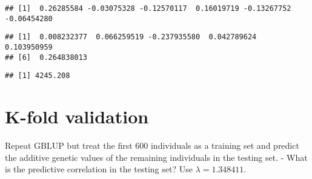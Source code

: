 \documentclass[
]{article}
\newenvironment{Shaded}{\begin{snugshade}}{\end{snugshade}}
\newcommand{\CommentTok}[1]{\textcolor[rgb]{0.56,0.35,0.01}{\textit{#1}}}
\newcommand{\FunctionTok}[1]{\textcolor[rgb]{0.13,0.29,0.53}{\textbf{#1}}}
\newcommand{\NormalTok}[1]{#1}
\newcommand{\SpecialCharTok}[1]{\textcolor[rgb]{0.81,0.36,0.00}{\textbf{#1}}}
\begin{document}
\begin{verbatim}
## [1]  0.26285584 -0.03075328 -0.12570117  0.16019719 -0.13267752 -0.06454280
\end{verbatim}

\begin{Shaded}
\end{Shaded}

\begin{verbatim}
## [1]  0.008232377  0.066259519 -0.237935580  0.042789624  0.103950959
## [6]  0.264838013
\end{verbatim}

\begin{Shaded}
\end{Shaded}

\begin{verbatim}
## [1] 4245.208
\end{verbatim}

\begin{Shaded}
\end{Shaded}

\section{K-fold validation}\label{k-fold-validation}

Repeat GBLUP but treat the first 600 individuals as a training set and
predict the additive genetic values of the remaining individuals in the
testing set. - What is the predictive correlation in the testing set?
Use \(\lambda = 1.348411\).
\end{document}
